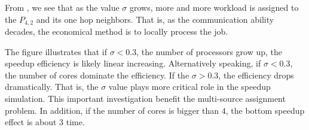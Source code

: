 From ,  we see that as the value $\sigma$ grows, more and more workload is assigned to the $P_{4, 2}$ and its one hop neighbors.   That is,  as the communication ability decades,  the economical method is to locally process the job.  

The figure illustrates that if $\sigma < 0.3$, the number of processors grow up, the speedup efficiency is likely linear increasing.   Alternatively speaking, if $\sigma < 0.3$, the number of cores dominate the efficiency.   If the $\sigma > 0.3$, the efficiency drops dramatically.   That is, the $\sigma$ value plays more critical role in the speedup simulation.   This important investigation benefit the multi-source assignment problem.   In addition, if the number of cores is bigger than $4$, the bottom speedup effect is about $3$ time.   
\newpage 